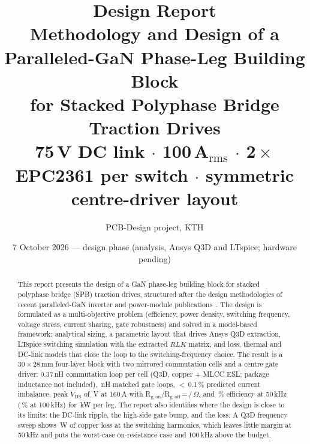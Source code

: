 \documentclass[10pt,a4paper]{article}
\title{\textbf{Design Report}\\[4pt]\large Methodology and Design of a Paralleled-GaN Phase-Leg Building Block\\for Stacked Polyphase Bridge Traction Drives\\[3pt]\normalsize 75\,V DC link $\cdot$ 100\,A$_\mathrm{rms}$ $\cdot$ 2\,$\times$\,EPC2361 per switch $\cdot$ symmetric centre-driver layout}
\author{PCB-Design project, KTH}
\date{7 October 2026 --- design phase (analysis, Ansys Q3D and LTspice; hardware pending)}
\begin{document}
\maketitle

\begin{abstract}
\noindent This report presents the design of a GaN phase-leg building block for stacked polyphase bridge (SPB) traction drives, structured after the design methodologies of recent paralleled-GaN inverter and power-module publications~\cite{tran2025,zou2025,cooke2026,wattenberg2023,lu2017,brothers2019}.
The design is formulated as a multi-objective problem (efficiency, power density, switching frequency, voltage stress, current sharing, gate robustness) and solved in a model-based framework: analytical sizing, a parametric layout that drives Ansys Q3D extraction, LTspice switching simulation with the extracted $RLK$ matrix, and loss, thermal and DC-link models that close the loop to the switching-frequency choice.
The result is a 30\,$\times$\,28\,mm four-layer block with two mirrored commutation cells and a centre gate driver: 0.37\,nH commutation loop per cell (Q3D, copper + MLCC ESL; package inductance not included), \LgateOne\,nH matched gate loops, $<$\,0.1\,\% predicted current imbalance, peak $V_\mathrm{DS}$ of \VdsL\,V at 160\,A with R$_\mathrm{g,on}$/R$_\mathrm{g,off}$\,=\,\RgOn/\RgOff\,$\Omega$, and \Eta\,\% efficiency at 50\,kHz (\EtaHundred\,\% at 100\,kHz) for \Prated\,kW per leg.
The report also identifies where the design is close to its limits: the DC-link ripple, the high-side gate bump, and the loss. A Q3D frequency sweep shows \PcuHf\,W of copper loss at the switching harmonics, which leaves little margin at 50\,kHz and puts the worst-case on-resistance case and 100\,kHz above the budget.
\end{abstract}
\end{document}
